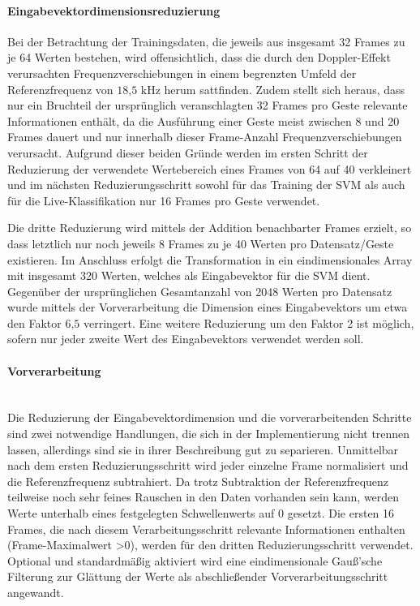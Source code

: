 \paragraph{Eingabevektordimensionsreduzierung}\label{sec:svm_reduce}$\;$ \\
Bei der Betrachtung der Trainingsdaten, die jeweils aus insgesamt 32 Frames zu je 64 Werten bestehen, wird offensichtlich, dass die durch den Doppler-Effekt verursachten Frequenzverschiebungen in einem begrenzten Umfeld der Referenzfrequenz von $18\text{,}5\text{ kHz}$ herum sattfinden.
Zudem stellt sich heraus, dass nur ein Bruchteil der ursprünglich veranschlagten 32 Frames pro Geste relevante Informationen enthält, da die Ausführung einer Geste meist zwischen 8 und 20 Frames dauert und nur innerhalb dieser Frame-Anzahl Frequenzverschiebungen verursacht.
Aufgrund dieser beiden Gründe werden im ersten Schritt der Reduzierung der verwendete Wertebereich eines Frames von 64 auf 40 verkleinert und im nächsten Reduzierungsschritt sowohl für das Training der \ac{SVM} als auch für die Live-Klassifikation nur 16 Frames pro Geste verwendet. 

Die dritte Reduzierung wird mittels der Addition benachbarter Frames erzielt, so dass letztlich nur noch jeweils 8 Frames zu je 40 Werten pro Datensatz/Geste existieren.
Im Anschluss erfolgt die Transformation in ein eindimensionales Array mit insgesamt 320 Werten, welches als Eingabevektor für die \ac{SVM} dient.
Gegenüber der ursprünglichen Gesamtanzahl von 2048 Werten pro Datensatz wurde mittels der Vorverarbeitung die Dimension eines Eingabevektors um etwa den Faktor $6\text{,}5$ verringert.
Eine weitere Reduzierung um den Faktor 2 ist möglich, sofern nur jeder zweite Wert des Eingabevektors verwendet werden soll.

\paragraph{Vorverarbeitung}\label{sec:svm_preprocess}$\;$ \\\\
Die Reduzierung der Eingabevektordimension und die vorverarbeitenden Schritte sind zwei notwendige Handlungen, die sich in der Implementierung nicht trennen lassen, allerdings sind sie in ihrer Beschreibung gut zu separieren.
Unmittelbar nach dem ersten Reduzierungsschritt wird jeder einzelne Frame normalisiert und die Referenzfrequenz subtrahiert.
Da trotz Subtraktion der Referenzfrequenz teilweise noch sehr feines Rauschen in den Daten vorhanden sein kann, werden Werte unterhalb eines festgelegten Schwellenwerts auf 0 gesetzt.
Die ersten 16 Frames, die nach diesem Verarbeitungsschritt relevante Informationen enthalten (Frame-Maximalwert \textgreater 0), werden für den dritten Reduzierungsschritt verwendet.
Optional und standardmäßig aktiviert wird eine eindimensionale Gauß'sche Filterung zur Glättung der Werte als abschließender Vorverarbeitungsschritt angewandt.

